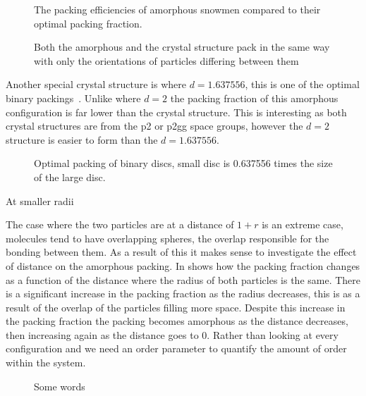 \begin{figure}
    \caption{The packing efficiencies of amorphous snowmen compared to their optimal packing fraction.}
    \label{fig:fix d var r}
\end{figure}

\begin{figure}
    \label{fig:config:d1r2}
    \caption{Both the amorphous and the crystal structure pack in the same way with only the orientations of particles differing between them}
\end{figure}

Another special crystal structure is where $d=1.637556$, this is one of the optimal binary packings~. Unlike where $d=2$ the packing fraction of this amorphous configuration is far lower than the crystal structure. This is interesting as both crystal structures are from the p2 or p2gg space groups, however the $d=2$ structure is easier to form than the $d=1.637556$.

\begin{figure}
    \caption{Optimal packing of binary discs, small disc is 0.637556 times the size of the large disc.}
    \label{crys:d=1.637556}
\end{figure}

At smaller radii 

The case where the two particles are at a distance of $1+r$ is an extreme case, molecules tend to have overlapping spheres, the overlap responsible for the bonding between them. As a result of this it makes sense to investigate the effect of distance on the amorphous packing. In  shows how the packing fraction changes as a function of the distance where the radius of both particles is the same. There is a significant increase in the packing fraction as the radius decreases, this is as a result of the overlap of the particles filling more space. Despite this increase in the packing fraction the packing becomes amorphous as the distance decreases, then increasing again as the distance goes to 0. Rather than looking at every configuration and we need an order parameter to quantify the amount of order within the system.

\begin{figure}
    \label{fig:var d fix r}
    \caption{Some words}
\end{figure}


